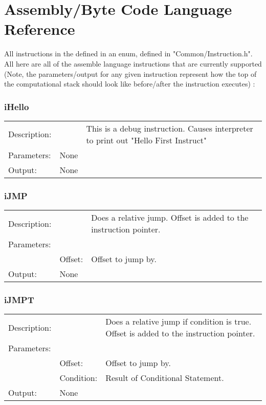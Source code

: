 \documentclass{standalone}
\begin{document}
\chapter{Assembly/Byte Code Language Reference}
	All instructions in the defined in an enum, defined in "Common/Instruction.h".
	All here are all of the assemble language instructions that are currently supported (Note, the parameters/output for any given instruction represent how the top of the computational stack should look like before/after the instruction executes) :

\subsection{iHello}
\begin{tabular}{l l p{10cm}}
Description: & ~    & This is a debug instruction. Causes interpreter to print out "Hello First Instruct"\\
Parameters:  & None & ~ \\
Output:      & None & ~ \\
\end{tabular}


\subsection{iJMP}
\begin{tabular}{l l p{10cm}}
Description: & ~    & Does a relative jump. Offset is added to the instruction pointer.\\
Parameters:  & ~ & ~ \\
~			 & Offset: & Offset to jump by.\\
Output:      & None & ~ \\
\end{tabular}

\subsection{iJMPT}
\begin{tabular}{l l p{10cm}}
Description: & ~    & Does a relative jump if condition is true. Offset is added to the instruction pointer.\\
Parameters:  & ~ & ~ \\
~			 & Offset: & Offset to jump by.\\
~			 & Condition: & Result of Conditional Statement.\\
Output:      & None & ~ \\
\end{tabular}
\end{document}
